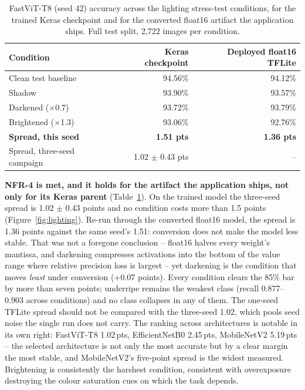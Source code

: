\documentclass{article}
\begin{document}
\begin{table}[t]
\centering
\caption{FastViT-T8 (seed 42) accuracy across the lighting stress-test conditions, for the trained Keras
checkpoint and for the converted float16 artifact the application ships. Full test split, 2,722 images per
condition.}
\label{tab:lighting}
\begin{tabular}{@{}lrr@{}}
\toprule
Condition & Keras checkpoint & Deployed float16 TFLite \\
\midrule
Clean test baseline & 94.56\% & 94.12\% \\
Shadow & 93.90\% & 93.57\% \\
Darkened ($\times$0.7) & 93.72\% & 93.79\% \\
Brightened ($\times$1.3) & 93.06\% & 92.76\% \\
\midrule
\textbf{Spread, this seed} & \textbf{1.51 pts} & \textbf{1.36 pts} \\
Spread, three-seed campaign & 1.02 $\pm$ 0.43 pts & -- \\
\bottomrule
\end{tabular}
\end{table}

\textbf{NFR-4 is met, and it holds for the artifact the application ships, not only for its Keras parent}
(Table~\ref{tab:lighting}). On the trained model the three-seed spread is 1.02 $\pm$ 0.43 points and no
condition costs more than 1.5 points (Figure~\ref{fig:lighting}). Re-run through the converted float16
model, the spread is 1.36 points against the same seed's 1.51: conversion does not make the model less
stable. That was not a foregone conclusion -- float16 halves every weight's mantissa, and darkening
compresses activations into the bottom of the value range where relative precision loss is largest -- yet
darkening is the condition that moves \textit{least} under conversion (+0.07 points). Every condition
clears the 85\% bar by more than seven points; underripe remains the weakest class (recall 0.877--0.903
across conditions) and no class collapses in any of them. The one-seed TFLite spread should not be compared
with the three-seed 1.02, which pools seed noise the single run does not carry. The ranking
across architectures is notable in its own right: FastViT-T8 1.02\,pts, EfficientNetB0 2.45\,pts,
MobileNetV2 5.19\,pts -- the selected architecture is not only the most accurate but by a clear margin the
most stable, and MobileNetV2's five-point spread is the widest measured. Brightening is consistently the
harshest condition, consistent with overexposure destroying the colour saturation cues on which the task
depends.
\end{document}
